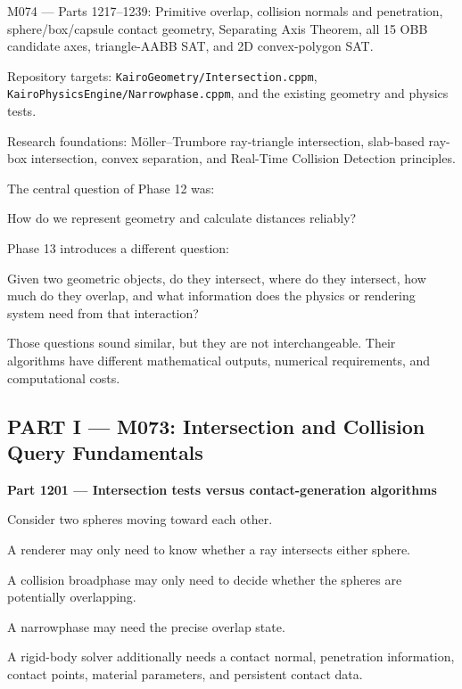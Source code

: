 M074 --- Parts 1217--1239: Primitive overlap, collision normals and penetration, sphere/box/capsule contact geometry, Separating Axis Theorem, all 15 OBB candidate axes, triangle-AABB SAT, and 2D convex-polygon SAT.

Repository targets: \texttt{KairoGeometry/Intersection.cppm}, \texttt{KairoPhysicsEngine/Narrowphase.cppm}, and the existing geometry and physics tests.

Research foundations: Möller--Trumbore ray-triangle intersection, slab-based ray-box intersection, convex separation, and Real-Time Collision Detection principles.

The central question of Phase 12 was:

How do we represent geometry and calculate distances reliably?

Phase 13 introduces a different question:

Given two geometric objects, do they intersect, where do they intersect, how much do they overlap, and what information does the physics or rendering system need from that interaction?

Those questions sound similar, but they are not interchangeable. Their algorithms have different mathematical outputs, numerical requirements, and computational costs.

\subsection{PART I --- M073: Intersection and Collision Query Fundamentals}\label{04-visual-computing-ii-ch023-part-i-m073-intersection-and-collision-query-fundamentals}

\hypertarget{04-visual-computing-ii-ch023-part-i-m073-intersection-and-collision-query-fundamentals}{}

\textbf{Part 1201 --- Intersection tests versus contact-generation algorithms}

Consider two spheres moving toward each other.

A renderer may only need to know whether a ray intersects either sphere.

A collision broadphase may only need to decide whether the spheres are potentially overlapping.

A narrowphase may need the precise overlap state.

A rigid-body solver additionally needs a contact normal, penetration information, contact points, material parameters, and persistent contact data.

